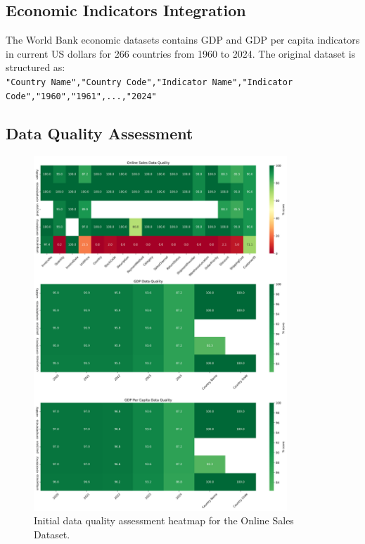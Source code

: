 \documentclass[a4paper,11pt]{article}
\begin{document}
\subsection{Economic Indicators Integration}

The World Bank economic datasets contains GDP and GDP per capita indicators in current US dollars for 266 countries from 1960 to 2024. 
The original dataset is structured as:\\
\texttt{"Country Name","Country Code","Indicator Name","Indicator Code","1960","1961",...,"2024"}

\subsection{Data Quality Assessment}
\begin{figure}[H]
    \centering
    \includegraphics[width=0.85\textwidth]{../Visualizations/Pre/PRE_combined_heatmap.png}
    \caption{Initial data quality assessment heatmap for the Online Sales Dataset.}
    \label{fig:initial_data_quality_heatmap}
\end{figure}
\end{document}
